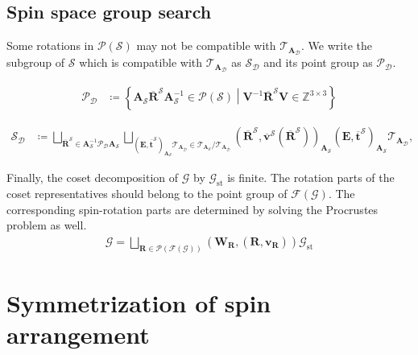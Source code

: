 \documentclass[a4paper, 11pt]{article}
\theoremstyle{definition}
\newcommand{\relmiddle}[1]{\mathrel{}\middle#1\mathrel{}}
\newcommand{\set}[2]{\left\{ #1 \relmiddle| #2 \right\}}
\begin{document}
\subsection{Spin space group search}

Some rotations in $\mathcal{P}(\mathcal{S})$ may not be compatible with $\mathcal{T}_{\bm{A}_{\mathcal{D}}}$.
We write the subgroup of $\mathcal{S}$ which is compatible with $\mathcal{T}_{\bm{A}_{\mathcal{D}}}$ as $\mathcal{S}_{\mathcal{D}}$ and its point group as $\mathcal{P}_{\mathcal{D}}$.

\begin{align}
  \mathcal{P}_{\mathcal{D}}
    &\coloneqq \set{
        \bm{A}_{\mathcal{S}} \overline{\bm{R}}^{\mathcal{S}} \bm{A}_{\mathcal{S}}^{-1} \in \mathcal{P}(\mathcal{S})
      }{
        \bm{V}^{-1} \overline{\bm{R}}^{\mathcal{S}} \bm{V} \in \mathbb{Z}^{3 \times 3}
      }
\end{align}

\begin{align}
  \mathcal{S}_{\mathcal{D}}
    &\coloneqq \bigsqcup_{
          \overline{\bm{R}}^{\mathcal{S}} \in \bm{A}_{\mathcal{S}}^{-1} \mathcal{P}_{\mathcal{D}} \bm{A}_{\mathcal{S}}
      } \bigsqcup_{
          \left( \bm{E}, \overline{ \bm{t} }^{\mathcal{S}} \right)_{ \bm{A}_{\mathcal{S}} } \mathcal{T}_{\bm{A}_{\mathcal{D}}}
          \in \mathcal{T}_{\bm{A}_{\mathcal{S}}} / \mathcal{T}_{\bm{A}_{\mathcal{D}}}
      }
      \left(
        \overline{\bm{R}}^{\mathcal{S}},
        \overline{ \bm{v} }^{\mathcal{S}}(\overline{\bm{R}}^{\mathcal{S}})
      \right)_{ \bm{A}_{\mathcal{S}} }
      \left( \bm{E}, \overline{ \bm{t} }^{\mathcal{S}} \right)_{ \bm{A}_{\mathcal{S}} }
      \mathcal{T}_{\bm{A}_{\mathcal{D}}},
\end{align}

Finally, the coset decomposition of $\mathcal{G}$ by $\mathcal{G}_{\mathrm{st}}$ is finite.
The rotation parts of the coset representatives should belong to the point group of $\mathcal{F}(\mathcal{G})$.
The corresponding spin-rotation parts are determined by solving the Procrustes problem as well.
\begin{align}
  \mathcal{G}
    = \bigsqcup_{ \bm{R} \in \mathcal{P}(\mathcal{F}(\mathcal{G})) } (\bm{W}_{\bm{R}}, (\bm{R}, \bm{v}_{\bm{R}})) \mathcal{G}_{\mathrm{st}}
\end{align}

\section{Symmetrization of spin arrangement}
\end{document}
